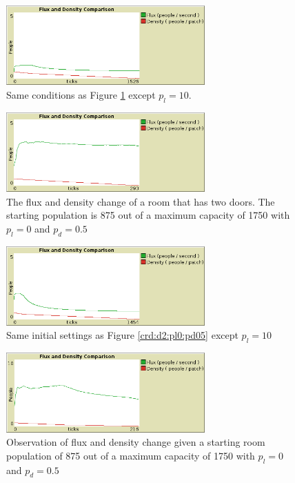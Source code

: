 \documentclass{article}%
\begin{document}
    \begin{figure}[ht!]
        \centering
        \includegraphics[width=3in]{../img/Crowd34x541d_pl10pd0d5.png}
        \caption{ Same conditions as Figure \ref{crd:d1:pl0:pd0d5} except $p_l = 10$.}
        \label{crd:d1:pl0:pd0d5}
    \end{figure}

    \begin{figure}[ht!]
        \centering
        \includegraphics[width=3in]{../img/Crowd34x542d_pl0pd0d5.png}
        \caption{The flux and density change of a room that has two doors. The starting population is 875 out of a maximum capacity of 1750 with $p_l = 0$ and $p_d = 0.5$}
        \label{crd:d2:pl0:pd0d5}
    \end{figure}

    \begin{figure}[ht!]
        \centering
        \includegraphics[width=3in]{../img/Crowd34x542d_pl10pd0d5.png}
        \caption{Same initial settings as Figure \ref{crd:d2:pl0:pd05} except $p_l = 10$}
        \label{crd:d2:pl10:pd0d5}
    \end{figure}

    \begin{figure}[ht!]
        \centering
        \includegraphics[width=3in]{../img/Crowd34x544d_pl0pd0d5.png}
        \caption{ Observation of flux and density change given a starting room population of 875 out of a maximum capacity of 1750 with $p_l = 0$ and $p_d = 0.5$}
        \label{crd:d4:pl0:pd0d5}
    \end{figure}
\end{document}
